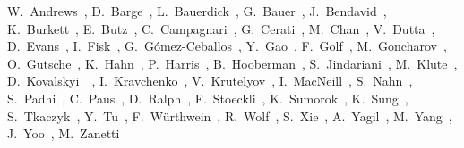 \begin{Authlist}
%
W.~Andrews~, 
D.~Barge~, 
L.~Bauerdick~, 
G.~Bauer~,
J.~Bendavid~,
K.~Burkett~, 
E.~Butz~,
C.~Campagnari~, 
G.~Cerati~,
M.~Chan~,
V.~Dutta~,
D.~Evans~, 
I.~Fisk~, 
G.~G\'omez-Ceballos~,
Y.~Gao~, 
F.~Golf~, 
M.~Goncharov~,
O.~Gutsche~, 
K.~Hahn~,
P.~Harris~,
B.~Hooberman~,
S.~Jindariani~,
M.~Klute~,
D.~Kovalskyi~~, 
I.~Kravchenko~,
V.~Krutelyov~, 
I.~MacNeill~,
S.~Nahn~,
S.~Padhi~, 
C.~Paus~,
D.~Ralph~,
F.~Stoeckli~,
K.~Sumorok~,
K.~Sung~,
S.~Tkaczyk~,
Y.~Tu~, 
F.~W\"urthwein~, 
R.~Wolf~,
S.~Xie~,
A.~Yagil~, 
M.~Yang~,
J.~Yoo~,
M.~Zanetti~
%
\end{Authlist}
